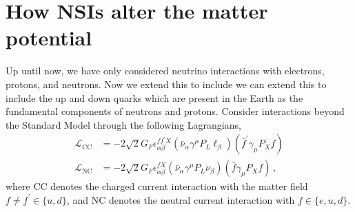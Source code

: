 \documentclass[draft=True]{thesis}
\begin{document}
\section{How NSIs alter the matter potential}
Up until now, we have only considered neutrino interactions with electrons, protons, and neutrons. Now we extend this to include we can extend this to include 
the up and down quarks which are present in the Earth as the fundamental components of neutrons and protons. 
Consider interactions beyond the Standard Model through the following Lagrangians,
\begin{align*}
    \mathcal{L}_{\mathrm{CC}} &= -2 \sqrt{2} G_{F} \epsilon_{\alpha \beta}^{f f^{\prime} X}\left(\bar{\nu}_{\alpha} \gamma^{\mu} P_{L} \ell_{\beta}\right)\left(\bar{f}^{\prime} \gamma_{\mu} P_{X} f\right) \\
    \mathcal{L}_{\mathrm{NC}} &= -2 \sqrt{2} G_{F} \epsilon_{\alpha \beta}^{f X}\left(\bar{\nu}_{\alpha} \gamma^{\mu} P_{L} \nu_{\beta}\right)\left(\bar{f} \gamma_{\mu} P_{X} f\right)\,,
\end{align*}
where CC denotes the charged current interaction with the matter field $f\neq f^\prime \in \{u,d\}$, and NC denotes the neutral current interaction with 
$f \in \{e,u,d\}$. 
\end{document}
